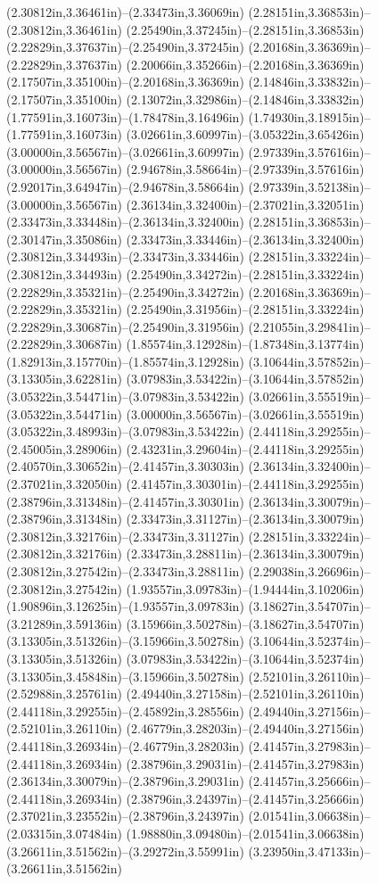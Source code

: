 (2.30812in,3.36461in)--(2.33473in,3.36069in) (2.28151in,3.36853in)--(2.30812in,3.36461in) (2.25490in,3.37245in)--(2.28151in,3.36853in) (2.22829in,3.37637in)--(2.25490in,3.37245in) (2.20168in,3.36369in)--(2.22829in,3.37637in) (2.20066in,3.35266in)--(2.20168in,3.36369in) (2.17507in,3.35100in)--(2.20168in,3.36369in) (2.14846in,3.33832in)--(2.17507in,3.35100in) (2.13072in,3.32986in)--(2.14846in,3.33832in) (1.77591in,3.16073in)--(1.78478in,3.16496in) (1.74930in,3.18915in)--(1.77591in,3.16073in) (3.02661in,3.60997in)--(3.05322in,3.65426in) (3.00000in,3.56567in)--(3.02661in,3.60997in) (2.97339in,3.57616in)--(3.00000in,3.56567in) (2.94678in,3.58664in)--(2.97339in,3.57616in) (2.92017in,3.64947in)--(2.94678in,3.58664in) (2.97339in,3.52138in)--(3.00000in,3.56567in) (2.36134in,3.32400in)--(2.37021in,3.32051in) (2.33473in,3.33448in)--(2.36134in,3.32400in) (2.28151in,3.36853in)--(2.30147in,3.35086in) (2.33473in,3.33446in)--(2.36134in,3.32400in) (2.30812in,3.34493in)--(2.33473in,3.33446in) (2.28151in,3.33224in)--(2.30812in,3.34493in) (2.25490in,3.34272in)--(2.28151in,3.33224in) (2.22829in,3.35321in)--(2.25490in,3.34272in) (2.20168in,3.36369in)--(2.22829in,3.35321in) (2.25490in,3.31956in)--(2.28151in,3.33224in) (2.22829in,3.30687in)--(2.25490in,3.31956in) (2.21055in,3.29841in)--(2.22829in,3.30687in) (1.85574in,3.12928in)--(1.87348in,3.13774in) (1.82913in,3.15770in)--(1.85574in,3.12928in) (3.10644in,3.57852in)--(3.13305in,3.62281in) (3.07983in,3.53422in)--(3.10644in,3.57852in) (3.05322in,3.54471in)--(3.07983in,3.53422in) (3.02661in,3.55519in)--(3.05322in,3.54471in) (3.00000in,3.56567in)--(3.02661in,3.55519in) (3.05322in,3.48993in)--(3.07983in,3.53422in) (2.44118in,3.29255in)--(2.45005in,3.28906in) (2.43231in,3.29604in)--(2.44118in,3.29255in) (2.40570in,3.30652in)--(2.41457in,3.30303in) (2.36134in,3.32400in)--(2.37021in,3.32050in) (2.41457in,3.30301in)--(2.44118in,3.29255in) (2.38796in,3.31348in)--(2.41457in,3.30301in) (2.36134in,3.30079in)--(2.38796in,3.31348in) (2.33473in,3.31127in)--(2.36134in,3.30079in) (2.30812in,3.32176in)--(2.33473in,3.31127in) (2.28151in,3.33224in)--(2.30812in,3.32176in) (2.33473in,3.28811in)--(2.36134in,3.30079in) (2.30812in,3.27542in)--(2.33473in,3.28811in) (2.29038in,3.26696in)--(2.30812in,3.27542in) (1.93557in,3.09783in)--(1.94444in,3.10206in) (1.90896in,3.12625in)--(1.93557in,3.09783in) (3.18627in,3.54707in)--(3.21289in,3.59136in) (3.15966in,3.50278in)--(3.18627in,3.54707in) (3.13305in,3.51326in)--(3.15966in,3.50278in) (3.10644in,3.52374in)--(3.13305in,3.51326in) (3.07983in,3.53422in)--(3.10644in,3.52374in) (3.13305in,3.45848in)--(3.15966in,3.50278in) (2.52101in,3.26110in)--(2.52988in,3.25761in) (2.49440in,3.27158in)--(2.52101in,3.26110in) (2.44118in,3.29255in)--(2.45892in,3.28556in) (2.49440in,3.27156in)--(2.52101in,3.26110in) (2.46779in,3.28203in)--(2.49440in,3.27156in) (2.44118in,3.26934in)--(2.46779in,3.28203in) (2.41457in,3.27983in)--(2.44118in,3.26934in) (2.38796in,3.29031in)--(2.41457in,3.27983in) (2.36134in,3.30079in)--(2.38796in,3.29031in) (2.41457in,3.25666in)--(2.44118in,3.26934in) (2.38796in,3.24397in)--(2.41457in,3.25666in) (2.37021in,3.23552in)--(2.38796in,3.24397in) (2.01541in,3.06638in)--(2.03315in,3.07484in) (1.98880in,3.09480in)--(2.01541in,3.06638in) (3.26611in,3.51562in)--(3.29272in,3.55991in) (3.23950in,3.47133in)--(3.26611in,3.51562in) 
